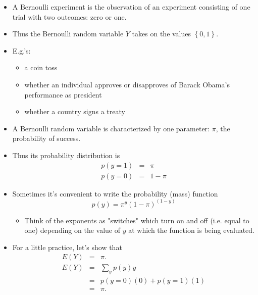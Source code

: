 \documentclass[11pt]{article}
\begin{document}
\begin{itemize}
\item A Bernoulli experiment is the observation of an experiment consisting
of one trial with two outcomes: zero or one.

\item Thus the Bernoulli random variable $Y$ takes on the values $\left\{
0,1\right\} .$

\item E.g.'s:

\begin{itemize}
\item a coin toss

\item whether an individual approves or disapproves of Barack Obama's
performance as president

\item whether a country signs a treaty
\end{itemize}

\item A Bernoulli random variable is characterized by one parameter: $\pi $,
the probability of success.

\item Thus its probability distribution is%
\begin{eqnarray*}
p\left( y=1\right) &=&\pi \\
p\left( y=0\right) &=&1-\pi
\end{eqnarray*}

\item Sometimes it's convenient to write the probability (mass) function%
\begin{equation*}
p\left( y\right) =\pi ^{y}\left( 1-\pi \right) ^{\left( 1-y\right) }
\end{equation*}

\begin{itemize}
\item Think of the exponents as "switches" which turn on and off (i.e. equal
to one) depending on the value of $y$ at which the function is being
evaluated.
\end{itemize}

\item For a little practice, let's show that%
\begin{eqnarray*}
E\left( Y\right) &=&\pi . \\
E\left( Y\right) &=&\sum_{y}p\left( y\right) y \\
&=&p\left( y=0\right) \left( 0\right) +p\left( y=1\right) \left( 1\right) \\
&=&\pi .
\end{eqnarray*}


\end{itemize}
\end{document}
